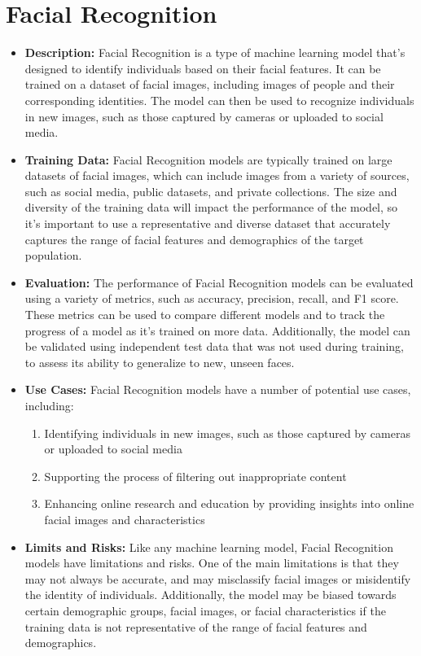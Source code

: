 \section{Facial Recognition}

\begin{itemize}
    \item \textbf{Description:} Facial Recognition is a type of machine learning model that's designed to identify individuals based on their facial features. It can be trained on a dataset of facial images, including images of people and their corresponding identities. The model can then be used to recognize individuals in new images, such as those captured by cameras or uploaded to social media.
    \item \textbf{Training Data:} Facial Recognition models are typically trained on large datasets of facial images, which can include images from a variety of sources, such as social media, public datasets, and private collections. The size and diversity of the training data will impact the performance of the model, so it's important to use a representative and diverse dataset that accurately captures the range of facial features and demographics of the target population.
    \item \textbf{Evaluation:} The performance of Facial Recognition models can be evaluated using a variety of metrics, such as accuracy, precision, recall, and F1 score. These metrics can be used to compare different models and to track the progress of a model as it's trained on more data. Additionally, the model can be validated using independent test data that was not used during training, to assess its ability to generalize to new, unseen faces.
    \item \textbf{Use Cases:} Facial Recognition models have a number of potential use cases, including:
        \begin{enumerate}  
            \item Identifying individuals in new images, such as those captured by cameras or uploaded to social media
            \item Supporting the process of filtering out inappropriate content
            \item Enhancing online research and education by providing insights into online facial images and characteristics
        \end{enumerate}
    \item \textbf{Limits and Risks:} Like any machine learning model, Facial Recognition models have limitations and risks. One of the main limitations is that they may not always be accurate, and may misclassify facial images or misidentify the identity of individuals. Additionally, the model may be biased towards certain demographic groups, facial images, or facial characteristics if the training data is not representative of the range of facial features and demographics.

\end{itemize}
